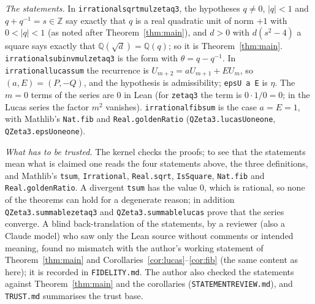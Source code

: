 \documentclass[11pt]{amsart}
\theoremstyle{definition}
\theoremstyle{remark}
\numberwithin{equation}{section}
\newcommand{\ZZ}{\mathbb{Z}}
\newcommand{\QQ}{\mathbb{Q}}
\newcommand{\lean}[1]{{\def\_{\textunderscore\allowbreak}\texttt{#1}}}
\begin{document}
\emph{The statements.} In \lean{irrational\_sqrt\_mul\_zetaq3}, the hypotheses $q\ne0$, $|q|<1$ and $q+q^{-1}=s\in\ZZ$
say exactly that $q$ is a real quadratic unit of norm $+1$ with $0<|q|<1$ (as noted after Theorem~\ref{thm:main}), and
$d>0$ with $d(s^2-4)$ a square says exactly that $\QQ(\sqrt d)=\QQ(q)$; so it is Theorem~\ref{thm:main}.
\lean{irrational\_sub\_inv\_mul\_zetaq3} is the form with $\theta=q-q^{-1}$. In \lean{irrational\_lucas\_sum} the
recurrence is $U_{m+2}=aU_{m+1}+EU_m$, so $(a,E)=(P,-Q)$, and the hypothesis is admissibility; \lean{epsU a E} is
$\eta$. The $m=0$ terms of the series are $0$ in Lean (for \lean{zetaq3} the term is $0\cdot1/0=0$; in the Lucas
series the factor $m^2$ vanishes). \lean{irrational\_fib\_sum} is the case $a=E=1$, with Mathlib's \lean{Nat.fib} and
\lean{Real.goldenRatio} (\lean{QZeta3.lucasU\_one\_one}, \lean{QZeta3.epsU\_one\_one}).

\emph{What has to be trusted.} The kernel checks the proofs; to see that the statements mean what is claimed one reads
the four statements above, the three definitions, and Mathlib's \lean{tsum}, \lean{Irrational}, \lean{Real.sqrt},
\lean{IsSquare}, \lean{Nat.fib} and \lean{Real.goldenRatio}. A divergent \lean{tsum} has the value $0$, which is
rational, so none of the theorems can hold for a degenerate reason; in addition \lean{QZeta3.summable\_zetaq3} and
\lean{QZeta3.summable\_lucas} prove that the series converge. A blind back-translation of the statements, by a reviewer
(also a Claude model) who saw only the Lean source without comments or intended meaning, found no mismatch with the
author's working statement of Theorem~\ref{thm:main} and Corollaries~\ref{cor:lucas}--\ref{cor:fib} (the same content
as here); it is recorded in \lean{FIDELITY.md}. The
author also checked the statements against Theorem~\ref{thm:main} and the corollaries (\lean{STATEMENT\_REVIEW.md}),
and \lean{TRUST.md} summarises the trust base.
\end{document}
